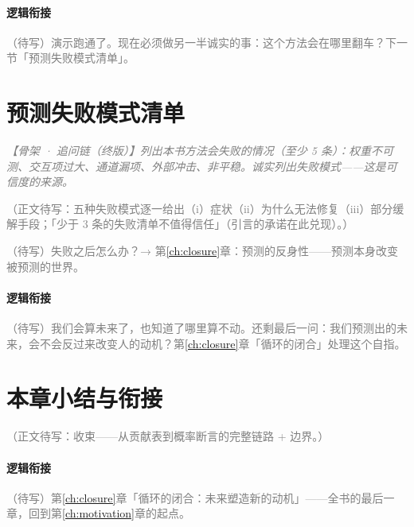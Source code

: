 \documentclass[../../main2.tex]{subfiles}
\begin{document}
	\paragraph*{逻辑衔接}
	\textcolor{gray}{（待写）演示跑通了。现在必须做另一半诚实的事：这个方法会在哪里翻车？下一节「预测失败模式清单」。}

	\section{预测失败模式清单}
	\label{sec:fc-failure}

	\textcolor{gray}{\textit{【骨架 · 追问链（终版）】列出本书方法会失败的情况（至少 5 条）：权重不可测、交互项过大、通道漏项、外部冲击、非平稳。诚实列出失败模式——这是可信度的来源。}}

	\textcolor{gray}{（正文待写：五种失败模式逐一给出（i）症状（ii）为什么无法修复（iii）部分缓解手段；「少于 3 条的失败清单不值得信任」（引言的承诺在此兑现）。）}

	\begin{reader_anticipation}
		\item \textcolor{gray}{（待写）失败之后怎么办？→ 第\ref{ch:closure}章：预测的反身性——预测本身改变被预测的世界。}
	\end{reader_anticipation}

	\paragraph*{逻辑衔接}
	\textcolor{gray}{（待写）我们会算未来了，也知道了哪里算不动。还剩最后一问：我们预测出的未来，会不会反过来改变人的动机？第\ref{ch:closure}章「循环的闭合」处理这个自指。}

	\section{本章小结与衔接}
	\label{sec:fc-summary}

	\textcolor{gray}{（正文待写：收束——从贡献表到概率断言的完整链路 + 边界。）}

	\paragraph*{逻辑衔接}
	\textcolor{gray}{（待写）第\ref{ch:closure}章「循环的闭合：未来塑造新的动机」——全书的最后一章，回到第\ref{ch:motivation}章的起点。}
\end{document}
